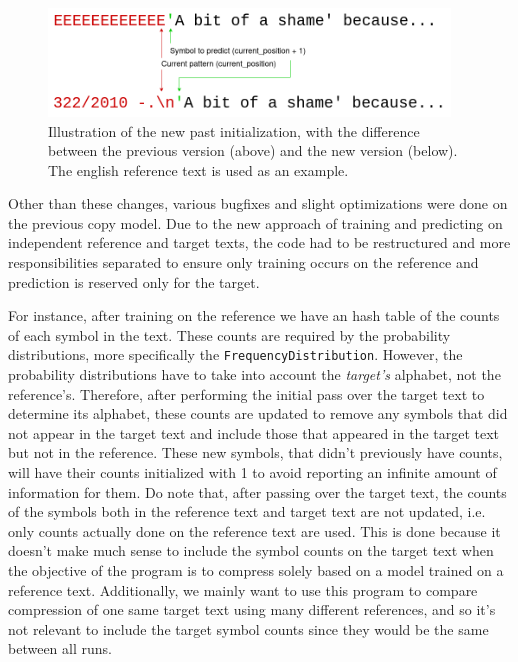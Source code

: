 \documentclass{article}
\begin{document}
\begin{figure}
    \centering
    \includegraphics[width=0.95\textwidth]{./images/lang_new_past.png}
    \caption{Illustration of the new past initialization, with the difference between the previous version (above) and the new version (below). The english reference text is used as an example.}
    \label{fig:lang_new_past}
\end{figure}

Other than these changes, various bugfixes and slight optimizations were done on the previous copy model.
Due to the new approach of training and predicting on independent reference and target texts, the code had to be restructured and more responsibilities separated to ensure only training occurs on the reference and prediction is reserved only for the target.

For instance, after training on the reference we have an hash table of the counts of each symbol in the text.
These counts are required by the probability distributions, more specifically the \texttt{FrequencyDistribution}.
However, the probability distributions have to take into account the \emph{target's} alphabet, not the reference's.
Therefore, after performing the initial pass over the target text to determine its alphabet, these counts are updated to remove any symbols that did not appear in the target text and include those that appeared in the target text but not in the reference.
These new symbols, that didn't previously have counts, will have their counts initialized with 1 to avoid reporting an infinite amount of information for them.
Do note that, after passing over the target text, the counts of the symbols both in the reference text and target text are not updated, i.e. only counts actually done on the reference text are used.
This is done because it doesn't make much sense to include the symbol counts on the target text when the objective of the program is to compress solely based on a model trained on a reference text.
Additionally, we mainly want to use this program to compare compression of one same target text using many different references, and so it's not relevant to include the target symbol counts since they would be the same between all runs.
\end{document}
